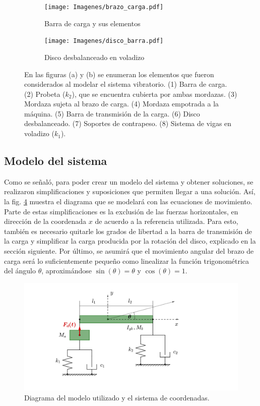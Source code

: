 \begin{figure}[p]
\centering
	\begin{subfigure}{1\linewidth}
		\centering
		\texttt{[image: Imagenes/brazo\_carga.pdf]}
		\caption{Barra de carga y sus elementos}\label{fig:elementos_brazo}
	\end{subfigure}
	\begin{subfigure}{1\linewidth}
		\centering
		\texttt{[image: Imagenes/disco\_barra.pdf]}
		\caption{Disco desbalanceado en voladizo}\label{fig:elementos_disco}
	\end{subfigure}
\caption{En las figuras (a) y (b) se enumeran los elementos que fueron considerados al modelar el sistema vibratorio. (1) Barra de carga. (2) Probeta ($k_2$), que se encuentra cubierta por ambas mordazas. (3) Mordaza sujeta al brazo de carga. (4) Mordaza empotrada a la máquina. (5) Barra de transmisión de la carga. (6) Disco desbalanceado. (7) Soportes de contrapeso. (8) Sistema de vigas en voladizo ($k_1$).}
\label{fig:elementos_modelo}
\end{figure}

\subsection{Modelo del sistema}
\label{sec:mod_sist}
Como se señaló, para poder crear un modelo del sistema y obtener soluciones, se realizaron simplificaciones y suposiciones que permiten llegar a una solución. Así, la fig. \ref{fig:diag_modelo} muestra el diagrama que se modelará con las ecuaciones de movimiento. Parte de estas simplificaciones es la exclusión de las fuerzas horizontales, en dirección de la coordenada $x$ de acuerdo a la referencia utilizada. Para esto, también es necesario quitarle los grados de libertad a la barra de transmisión de la carga y simplificar la carga producida por la rotación del disco, explicado en la sección siguiente. Por último, se asumirá que el movimiento angular del brazo de carga será lo suficientemente pequeño como linealizar la función trigonométrica del ángulo $\theta$, aproximándose $\sin(\theta) = \theta$ y $\cos(\theta)=1$.

\begin{figure}[h]
\centering
\includegraphics[width=0.9\linewidth, trim={5cm 2cm 10cm 1cm}, clip]{Imagenes/mach_diag.pdf}
\caption{Diagrama del modelo utilizado y el sistema de coordenadas.}
\label{fig:diag_modelo}
\end{figure}

